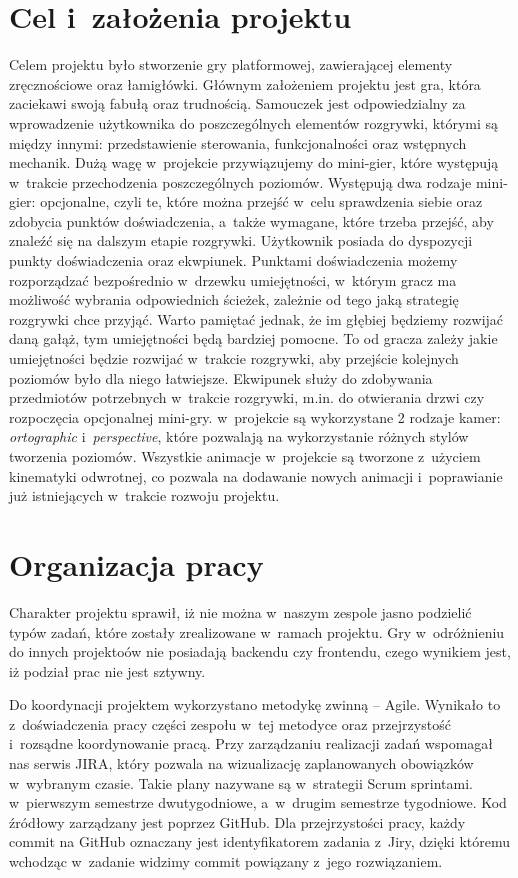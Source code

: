 \documentclass[oneside,polski,logo]{amuthesis}
\begin{document}
\section{Cel i~założenia projektu}
Celem projektu było stworzenie gry platformowej, zawierającej elementy zręcznościowe oraz łamigłówki. Głównym założeniem projektu jest gra, która zaciekawi swoją fabułą oraz trudnością. Samouczek jest odpowiedzialny za wprowadzenie użytkownika do poszczególnych elementów rozgrywki, którymi są między innymi: przedstawienie sterowania, funkcjonalności oraz wstępnych mechanik. Dużą wagę w~projekcie przywiązujemy do mini-gier, które występują w~trakcie przechodzenia poszczególnych poziomów. Występują dwa rodzaje mini-gier: opcjonalne, czyli te, które można przejść w~celu sprawdzenia siebie oraz zdobycia punktów doświadczenia, a~także wymagane, które trzeba przejść, aby znaleźć się na dalszym etapie rozgrywki. Użytkownik posiada do dyspozycji punkty doświadczenia oraz ekwpiunek. Punktami doświadczenia możemy rozporządzać bezpośrednio w~drzewku umiejętności, w~którym gracz ma możliwość wybrania odpowiednich ścieżek, zależnie od tego jaką strategię rozgrywki chce przyjąć. Warto pamiętać jednak, że im głębiej będziemy rozwijać daną gałąż, tym umiejętności będą bardziej pomocne. To od gracza zależy jakie umiejętności będzie rozwijać w~trakcie rozgrywki, aby przejście kolejnych poziomów było dla niego łatwiejsze. Ekwipunek służy do zdobywania przedmiotów potrzebnych w~trakcie rozgrywki, m.in. do otwierania drzwi czy rozpoczęcia opcjonalnej mini-gry. w~projekcie są wykorzystane 2 rodzaje kamer: \emph{ortographic} i~\emph{perspective}, które pozwalają na wykorzystanie różnych stylów tworzenia poziomów. Wszystkie animacje w~projekcie są tworzone z~użyciem kinematyki odwrotnej, co pozwala na dodawanie nowych animacji i~poprawianie już istniejących w~trakcie rozwoju projektu.
\section{Organizacja pracy}
Charakter projektu sprawił, iż nie można w~naszym zespole jasno podzielić typów zadań, które zostały zrealizowane w~ramach projektu. Gry w~odróżnieniu do innych projektoów nie posiadają backendu czy frontendu, czego wynikiem jest, iż podział prac nie jest sztywny. 

Do koordynacji projektem wykorzystano metodykę zwinną – Agile. Wynikało to z~doświadczenia pracy części zespołu w~tej metodyce oraz przejrzystość i~rozsądne koordynowanie pracą. Przy zarządzaniu realizacji zadań wspomagał nas serwis JIRA, który pozwala na wizualizację zaplanowanych obowiązków w~wybranym czasie. Takie plany nazywane są w~strategii Scrum sprintami.\\ w~pierwszym semestrze dwutygodniowe, a~w~drugim semestrze tygodniowe. Kod źródłowy zarządzany jest poprzez GitHub. Dla przejrzystości pracy, każdy commit na GitHub oznaczany jest identyfikatorem zadania z~Jiry, dzięki któremu wchodząc w~zadanie widzimy commit powiązany z~jego rozwiązaniem. 
\end{document}
